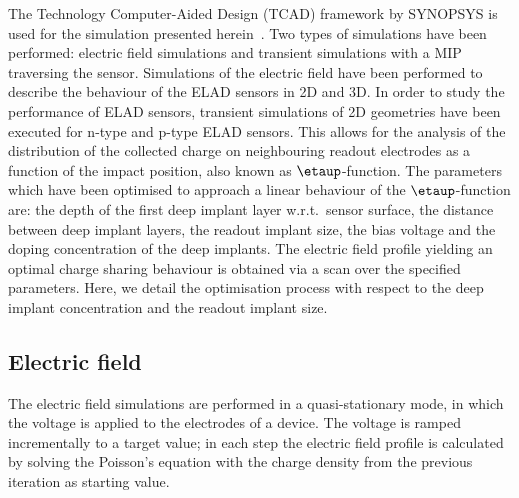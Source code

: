 \documentclass[a4paper,11pt]{article}
\begin{document}
The Technology Computer-Aided Design (TCAD) framework by SYNOPSYS is used for the simulation presented herein~\cite{syn}.
Two types of simulations have been performed: electric field simulations and transient simulations with a MIP traversing the sensor.
Simulations of the electric field have been performed to describe the behaviour of the ELAD sensors in 2D and 3D.
In order to study the performance of ELAD sensors, transient simulations of 2D geometries have been executed for n-type and p-type ELAD sensors.
This allows for the analysis of the distribution of the collected charge on neighbouring readout electrodes as a function of the impact position, also known as $\etaup$-function.
The parameters which have been optimised to approach a linear behaviour of the $\etaup$-function are: the depth of the first deep implant layer w.r.t.\ sensor surface, the distance between deep implant layers,
 the readout implant size, the bias voltage and the doping concentration of the deep implants. 
The electric field profile yielding an optimal charge sharing behaviour is obtained via a scan over the specified parameters.
Here, we detail the optimisation process with respect to the deep implant concentration and the readout implant size.


\subsection{Electric field}
\label{sec:ef}
The electric field simulations are performed in a quasi-stationary mode, in which the voltage is applied to the electrodes of a device.
The voltage is ramped incrementally to a target value; in each step the electric field profile is calculated
 by solving the Poisson's equation with the charge density from the previous iteration as starting value.
\end{document}
